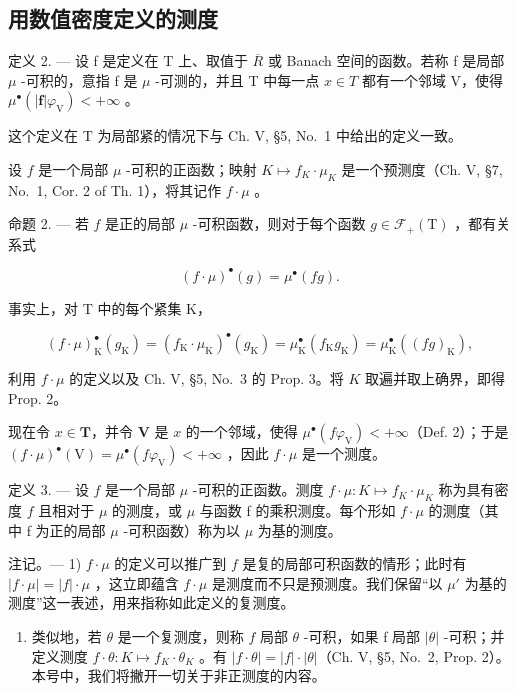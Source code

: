 \subsection{用数值密度定义的测度}

定义 2. --- 设 f 是定义在 T 上、取值于 \(\overline{R}\) 或 Banach 空间的函数。若称 f 是局部 \(\mu\) -可积的，意指 f 是 \(\mu\) -可测的，并且 T 中每一点 \(x \in T\) 都有一个邻域 V，使得 \(\mu^{\bullet}(|\mathbf{f}|\varphi_{\mathrm{V}}) < +\infty\) 。

这个定义在 T 为局部紧的情况下与 Ch. V, §5, No.~1 中给出的定义一致。

设 \(f\) 是一个局部 \(\mu\) -可积的正函数；映射 \(K \mapsto f_K \cdot \mu_K\) 是一个预测度（Ch. V, §7, No.~1, Cor. 2 of Th. 1），将其记作 \(f \cdot \mu\) 。

命题 2. --- 若 \(f\) 是正的局部 \(\mu\) -可积函数，则对于每个函数 \(g \in \mathcal{F}_{+}(\mathrm{T})\) ，都有关系式

\[
(f \cdot \mu) ^ {\bullet} (g) = \mu^ {\bullet} (f g).\tag{1}
\]

事实上，对 T 中的每个紧集 K，

\[
(f \cdot \mu) _ {\mathrm{K}} ^ {\bullet} (g _ {\mathrm{K}}) = (f _ {\mathrm{K}} \cdot \mu_ {\mathrm{K}}) ^ {\bullet} (g _ {\mathrm{K}}) = \mu_ {\mathrm{K}} ^ {\bullet} (f _ {\mathrm{K}} g _ {\mathrm{K}}) = \mu_ {\mathrm{K}} ^ {\bullet} ((f g) _ {\mathrm{K}}),
\]

利用 \(f \cdot \mu\) 的定义以及 Ch. V, §5, No.~3 的 Prop. 3。将 \(K\) 取遍并取上确界，即得 Prop. 2。

现在令 \(x \in \mathbf{T}\)，并令 \(\mathbf{V}\) 是 \(x\) 的一个邻域，使得 \(\mu^{\bullet}(f\varphi_{\mathrm{V}}) < +\infty\)（Def. 2）；于是 \((f \cdot \mu)^{\bullet}(\mathrm{V}) = \mu^{\bullet}(f\varphi_{\mathrm{V}}) < +\infty\) ，因此 \(f \cdot \mu\) 是一个测度。

定义 3. --- 设 \(f\) 是一个局部 \(\mu\) -可积的正函数。测度 \(f \cdot \mu : K \mapsto f_K \cdot \mu_K\) 称为具有密度 \(f\) 且相对于 \(\mu\) 的测度，或 \(\mu\) 与函数 f 的乘积测度。每个形如 \(f \cdot \mu\) 的测度（其中 f 为正的局部 \(\mu\) -可积函数）称为以 \(\mu\) 为基的测度。

注记。--- 1) \(f \cdot \mu\) 的定义可以推广到 \(f\) 是复的局部可积函数的情形；此时有 \(|f \cdot \mu| = |f| \cdot \mu\) ，这立即蕴含 \(f \cdot \mu\) 是测度而不只是预测度。我们保留“以 \(\mu'\) 为基的测度”这一表述，用来指称如此定义的复测度。

\begin{enumerate}
\def\labelenumi{\arabic{enumi})}
\setcounter{enumi}{1}
\tightlist
\item
  类似地，若 \(\theta\) 是一个复测度，则称 \(f\) 局部 \(\theta\) -可积，如果 f 局部 \(|\theta|\) -可积；并定义测度 \(f \cdot \theta : K \mapsto f_K \cdot \theta_K\) 。有 \(|f \cdot \theta| = |f| \cdot |\theta|\)（Ch. V, §5, No.~2, Prop. 2）。本号中，我们将撇开一切关于非正测度的内容。
\end{enumerate}

